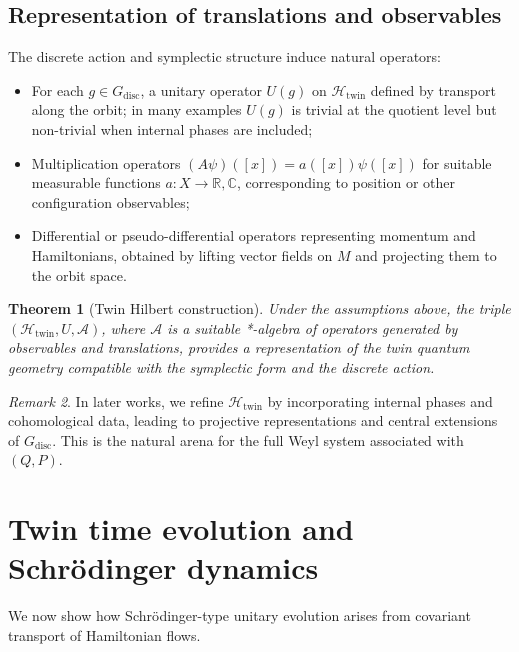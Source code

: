 \documentclass[11pt]{article}
\numberwithin{equation}{section}
\newtheorem{theorem}{Theorem}[section]
\theoremstyle{definition}
\theoremstyle{remark}
\newtheorem{remark}[theorem]{Remark}
\newcommand{\R}{\mathbb{R}}
\newcommand{\C}{\mathbb{C}}
\newcommand{\Htw}{\mathcal{H}_{\mathrm{twin}}}
\newcommand{\Gdisc}{G_{\mathrm{disc}}}
\begin{document}
	\subsection{Representation of translations and observables}
	
	The discrete action and symplectic structure induce natural operators:
	
	\begin{itemize}[leftmargin=2em]
		\item For each $g\in\Gdisc$, a unitary operator $U(g)$ on $\Htw$ defined
		by transport along the orbit; in many examples $U(g)$ is trivial
		at the quotient level but non-trivial when internal phases are
		included;
		\item Multiplication operators $(A\psi)([x]) = a([x])\psi([x])$ for
		suitable measurable functions $a:X\to\R,\C$, corresponding to
		position or other configuration observables;
		\item Differential or pseudo-differential operators representing
		momentum and Hamiltonians, obtained by lifting vector fields on
		$M$ and projecting them to the orbit space.
	\end{itemize}
	
	\begin{theorem}[Twin Hilbert construction]
		Under the assumptions above, the triple $(\Htw,U,\mathcal{A})$, where
		$\mathcal{A}$ is a suitable *-algebra of operators generated by
		observables and translations, provides a representation of the twin
		quantum geometry compatible with the symplectic form and the discrete
		action.
	\end{theorem}
	
	\begin{remark}
		In later works, we refine $\Htw$ by incorporating internal phases and
		cohomological data, leading to projective representations and central
		extensions of $\Gdisc$. This is the natural arena for the full Weyl
		system associated with $(Q,P)$.
	\end{remark}
	
	
	\section{Twin time evolution and Schr\"odinger dynamics}
	\label{sec:Schro}
	
	We now show how Schr\"odinger-type unitary evolution arises from
	covariant transport of Hamiltonian flows.
	
\end{document}
